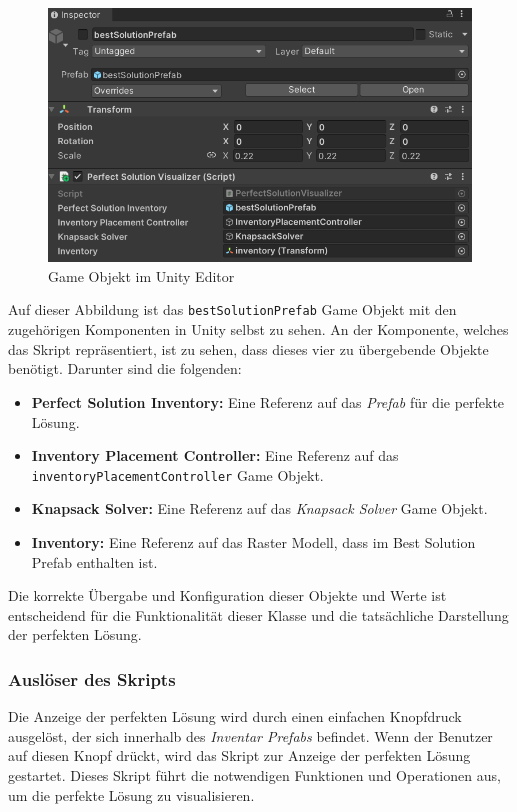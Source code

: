 \begin{figure}[H]
    \centering
    \includegraphics[scale=0.8]{images/bestSolPref_Editor}
    \caption{Game Objekt im Unity Editor}
    \label{fig:bestSol_Editor}
\end{figure}

Auf dieser Abbildung ist das \texttt{bestSolutionPrefab} Game Objekt mit den zugehörigen Komponenten in Unity selbst zu
sehen. An der Komponente, welches das Skript repräsentiert, ist zu sehen, dass dieses vier zu übergebende Objekte benötigt.
Darunter sind die folgenden:
\begin{itemize}
    \item \textbf{Perfect Solution Inventory:} Eine Referenz auf das \textit{Prefab} für die perfekte Lösung.
    \item \textbf{Inventory Placement Controller:} Eine Referenz auf das \texttt{inventoryPlacementController} Game Objekt.
    \item \textbf{Knapsack Solver:} Eine Referenz auf das \textit{Knapsack Solver} Game Objekt.
    \item \textbf{Inventory:} Eine Referenz auf das Raster Modell, dass im Best Solution Prefab enthalten ist.
\end{itemize}

Die korrekte Übergabe und Konfiguration dieser Objekte und Werte ist entscheidend für die Funktionalität dieser Klasse
und die tatsächliche Darstellung der perfekten Lösung.

\subsubsection{Auslöser des Skripts}
Die Anzeige der perfekten Lösung wird durch einen einfachen Knopfdruck ausgelöst, der sich innerhalb des \textit{Inventar Prefabs}
befindet. Wenn der Benutzer auf diesen Knopf drückt, wird das Skript zur Anzeige der perfekten Lösung gestartet. Dieses
Skript führt die notwendigen Funktionen und Operationen aus, um die perfekte Lösung zu visualisieren.

